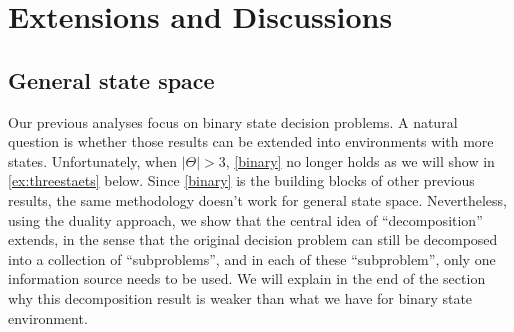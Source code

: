 \documentclass[11pt]{article}
\theoremstyle{plain}
\theoremstyle{remark}
\begin{document}
    	
\section{Extensions and Discussions}   

\subsection{General state space}
Our previous analyses focus on binary state decision problems. A natural question is whether those results can be extended into environments with more states. Unfortunately, when $|\Theta|>3$, \autoref{binary} no longer holds as we will show in \autoref{ex:threestaets} below. Since \autoref{binary} is the building blocks of other previous results, the same methodology doesn't work for general state space. Nevertheless, using the duality approach, we show that the central idea of ``decomposition'' extends, in the sense that the original decision problem can still be decomposed into a collection of ``subproblems'', and in each of these ``subproblem'', only one information source needs to be used. We will explain in the end of the section why this decomposition result is weaker than what we have for binary state environment.
\end{document}
